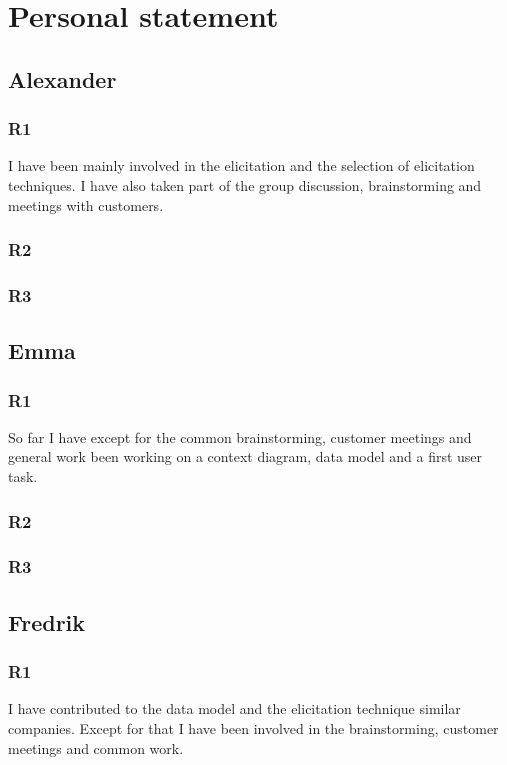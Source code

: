 \documentclass[a4paper]{article}
\begin{document}
  \section{Personal statement}
  
  \subsection{Alexander}
    \subsubsection{R1}
    I have been mainly involved in the elicitation and the selection of elicitation techniques. I have also taken part of the group discussion, brainstorming and meetings with customers.
    \subsubsection{R2}
    \subsubsection{R3}
  
  \subsection{Emma}
    \subsubsection{R1}
    So far I have except for the common brainstorming, customer meetings and general work been working on a context diagram, data model and a first user task.
    \subsubsection{R2}
    \subsubsection{R3}
	
  \subsection{Fredrik}
    \subsubsection{R1}
    I have contributed to the data model and the elicitation technique similar companies. Except for that I have been involved in the brainstorming, customer meetings and common work.
\end{document}
